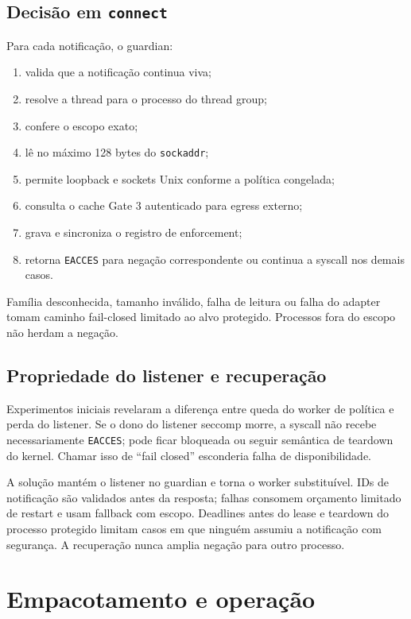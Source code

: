 \documentclass[11pt,a4paper]{article}
\begin{document}
\subsection{Decisão em \texttt{connect}}

Para cada notificação, o guardian:

\begin{enumerate}[leftmargin=*]
  \item valida que a notificação continua viva;
  \item resolve a thread para o processo do thread group;
  \item confere o escopo exato;
  \item lê no máximo 128 bytes do \texttt{sockaddr};
  \item permite loopback e sockets Unix conforme a política congelada;
  \item consulta o cache Gate 3 autenticado para egress externo;
  \item grava e sincroniza o registro de enforcement;
  \item retorna \texttt{EACCES} para negação correspondente ou continua a
        syscall nos demais casos.
\end{enumerate}

Família desconhecida, tamanho inválido, falha de leitura ou falha do adapter
tomam caminho fail-closed limitado ao alvo protegido. Processos fora do escopo
não herdam a negação.

\subsection{Propriedade do listener e recuperação}

Experimentos iniciais revelaram a diferença entre queda do worker de política e
perda do listener. Se o dono do listener seccomp morre, a syscall não recebe
necessariamente \texttt{EACCES}; pode ficar bloqueada ou seguir semântica de
teardown do kernel. Chamar isso de ``fail closed'' esconderia falha de
disponibilidade.

A solução mantém o listener no guardian e torna o worker substituível. IDs de
notificação são validados antes da resposta; falhas consomem orçamento limitado
de restart e usam fallback com escopo. Deadlines antes do lease e teardown do
processo protegido limitam casos em que ninguém assumiu a notificação com
segurança. A recuperação nunca amplia negação para outro processo.

\section{Empacotamento e operação}
\end{document}
